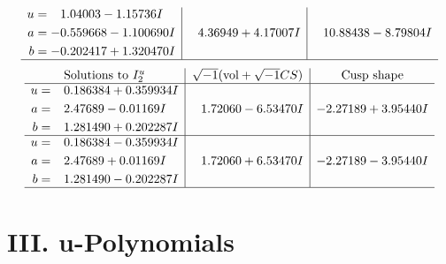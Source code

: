 \documentclass[1p]{elsarticle_modified}
\theoremstyle{definition}
\newcommand{\I}{\sqrt{-1}}
\begin{document}
$$\begin{array}{c|c|c}
\begin{aligned}
u &= \phantom{-}1.04003 - 1.15736 I \\
a &= -0.559668 - 1.100690 I \\
b &= -0.202417 + 1.320470 I\end{aligned}
 & \phantom{-}4.36949 + 4.17007 I & \phantom{-}10.88438 - 8.79804 I\\
 \hline 
 \end{array}$$\newpage$$\begin{array}{c|c|c}  
\text{Solutions to }I^u_{2}& \I (\text{vol} + \sqrt{-1}CS) & \text{Cusp shape}\\
 \hline 
\begin{aligned}
u &= \phantom{-}0.186384 + 0.359934 I \\
a &= \phantom{-}2.47689 - 0.01169 I \\
b &= \phantom{-}1.281490 + 0.202287 I\end{aligned}
 & \phantom{-}1.72060 - 6.53470 I & -2.27189 + 3.95440 I \\ \hline\begin{aligned}
u &= \phantom{-}0.186384 - 0.359934 I \\
a &= \phantom{-}2.47689 + 0.01169 I \\
b &= \phantom{-}1.281490 - 0.202287 I\end{aligned}
 & \phantom{-}1.72060 + 6.53470 I & -2.27189 - 3.95440 I\\
 \hline 
 \end{array}$$\newpage
\newpage\renewcommand{\arraystretch}{1}
\centering \section*{ III. u-Polynomials}
\end{document}
